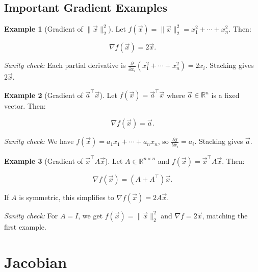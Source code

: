 \documentclass[10pt, twocolumn]{article}
\theoremstyle{definition}
\newtheorem{example}{Example}
\theoremstyle{plain}
\newcommand{\RR}{\mathbb{R}}
\begin{document}
\subsection{Important Gradient Examples}

\begin{example}[Gradient of $\|\vec{x}\|_2^2$]
Let $f(\vec{x}) = \|\vec{x}\|_2^2 = x_1^2 + \cdots + x_n^2$. Then:
\begin{result}
\[
    \nabla f(\vec{x}) = 2\vec{x}.
\]
\end{result}
\end{example}

\textit{Sanity check:} Each partial derivative is $\frac{\partial}{\partial x_i}(x_1^2 + \cdots + x_n^2) = 2x_i$. Stacking gives $2\vec{x}$. \checkmark

\begin{example}[Gradient of $\vec{a}^\top \vec{x}$]
Let $f(\vec{x}) = \vec{a}^\top \vec{x}$ where $\vec{a} \in \RR^n$ is a fixed vector. Then:
\begin{result}
\[
    \nabla f(\vec{x}) = \vec{a}.
\]
\end{result}
\end{example}

\textit{Sanity check:} We have $f(\vec{x}) = a_1 x_1 + \cdots + a_n x_n$, so $\frac{\partial f}{\partial x_i} = a_i$. Stacking gives $\vec{a}$. \checkmark

\begin{example}[Gradient of $\vec{x}^\top A \vec{x}$]
Let $A \in \RR^{n \times n}$ and $f(\vec{x}) = \vec{x}^\top A \vec{x}$. Then:
\begin{result}
\[
    \nabla f(\vec{x}) = (A + A^\top)\vec{x}.
\]
\end{result}
If $A$ is symmetric, this simplifies to $\nabla f(\vec{x}) = 2A\vec{x}$.
\end{example}

\textit{Sanity check:} For $A = I$, we get $f(\vec{x}) = \|\vec{x}\|_2^2$ and $\nabla f = 2\vec{x}$, matching the first example. \checkmark

\section{Jacobian}
\end{document}
